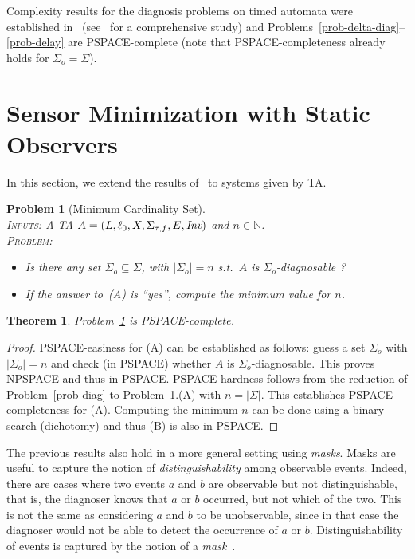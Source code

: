 \documentclass[letterpaper,10pt,conference]{ieeeconf}  \IEEEoverridecommandlockouts                              \overrideIEEEmargins
\def\st{{s.t.}~}
\newtheorem{prob}{Problem}  \newtheorem{definition}{Definition}
\newtheorem{theorem}{Theorem}
\newcommand{\setN}{\mathbb N}
\def\tauac{\tau}
\begin{document}
Complexity results for the diagnosis problems on timed automata were
established in~\cite{tripakis-02} (see~\cite{cassez-cdc-09} for a
comprehensive study) and
Problems~\ref{prob-delta-diag}--\ref{prob-delay} are PSPACE-complete
(note that PSPACE-completeness already holds for $\Sigma_o=\Sigma$).


\section{Sensor Minimization with Static Observers}
\label{sec-static}
In this section, we extend the results of~\cite{cassez-acsd-07} to
systems given by TA.


\begin{prob}[Minimum Cardinality Set] \label{prob-static-minimum} \mbox{} \\
  \textsc{Inputs:} A  TA $A=(L,\ell_0,X,\Sigma_{\tauac,f},E,\inv)$ and $n \in \setN$. \\
  \textsc{Problem:}
  \begin{itemize}
  \item[(A)] Is there any set $\Sigma_o \subseteq \Sigma$, with
    $|\Sigma_o| =n$ \st $A$ is $\Sigma_o$-diagnosable ?
  \item[(B)] If the answer to~(A) is ``yes'', compute the minimum
    value for $n$.
  \end{itemize}
\end{prob}
\begin{theorem}
  Problem~\ref{prob-static-minimum} is PSPACE-complete.
\end{theorem}
\begin{proof}
  PSPACE-easiness for (A) can be established as follows: guess a set
  $\Sigma_o$ with $|\Sigma_o| =n$ and check (in PS\-PACE) whether $A$ is
  $\Sigma_o$-diagnosable. This proves  NPSPACE and thus in
  PSPACE.  PSPACE-hardness follows from the reduction of
  Problem~\ref{prob-diag} to Problem~\ref{prob-static-minimum}.(A)
  with $n=|\Sigma|$.  This establishes PSPACE-completeness for (A).
  Computing the minimum $n$ can be done using a binary search
  (dichotomy) and thus (B) is also in PSPACE.
\end{proof}

\medskip The previous results also hold in a more general setting
using \emph{masks}.  Masks are useful to capture the notion of
\emph{distinguishability} among observable events.  Indeed, there are
cases where two events $a$ and $b$ are observable but not
distinguishable, that is, the diagnoser knows that $a$ or $b$
occurred, but not which of the two. This is not the same as
considering $a$ and $b$ to be unobservable, since in that case the
diagnoser would not be able to detect the occurrence of $a$ or $b$.
Distinguishability of events is captured by the notion of a
\emph{mask}~{\cite{Varaiyaetal88}}.
\end{document}

